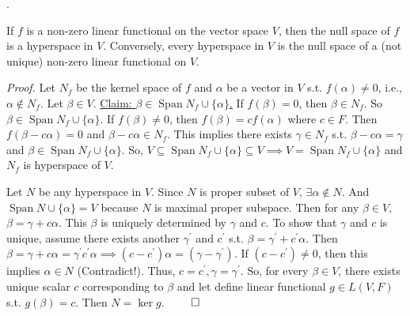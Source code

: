 \documentclass[8pt]{beamer}
\newcommand{\ti}[1]{\textit{#1}}
\newcommand{\Span}{\operatorname{Span}}
\begin{document}
\begin{frame}{.}
\begin{theorem}
        If $f$ is a non-zero linear functional on the vector space $V$, then the null space of $f$ is a hyperspace in $V$.
        Conversely, every hyperspace in $V$ is the null space of a (not unique) non-zero linear functional on $V$.
    \end{theorem}
    \ti{Proof.}
    Let $N_f$ be the kernel space of $f$ and $\alpha$ be a vector in $V$ s.t. $f(\alpha) \neq 0$, i.e., $\alpha \notin N_f$.
    Let $\beta \in V$.
    \underline{Claim: $\beta \in \Span N_f \cup \{\alpha\}$.}
    If $f(\beta) = 0$, then $\beta \in N_f$.
    So $\beta \in \Span N_f \cup \{\alpha\}$.
    If $f(\beta) \neq 0$, then $f(\beta) = cf(\alpha)$ where $c \in F$.
    Then $f(\beta - c \alpha) = 0$ and $\beta - c \alpha \in N_f$.
    This implies there exists $\gamma \in N_f$ s.t. $
    \beta - c \alpha = \gamma$ and $\beta \in \Span N_f \cup \{\alpha\}$.
    So, $V \subseteq \Span N_f \cup \{\alpha\} \subseteq V \implies V = \Span N_f \cup \{\alpha\}$ and $N_f$ is hyperspace of $V$.

    Let $N$ be any hyperspace in $V$.
    Since $N$ is proper subset of $V$, $\exists \alpha \notin N$. And $\Span N \cup \{\alpha\} = V$ because $N$ is maximal proper subspace.
    Then for any $\beta \in V$, $\beta = \gamma + c \alpha$. This $\beta$ is uniquely determined by $\gamma$ and $c$.
    To show that $\gamma$ and $c$ is unique, assume there exists another $\gamma^\prime$ and $c^\prime$ s.t. $\beta = \gamma^\prime + c^\prime \alpha$.
    Then $\beta = \gamma + c \alpha = \gamma^\prime c^\prime \alpha \implies (c - c^\prime) \alpha = (\gamma - \gamma^\prime)$. If $(c-c^\prime) \neq 0$, then this implies $\alpha \in N$ (Contradict!).
    Thus, $c = c^\prime, \gamma = \gamma^\prime$.
    So, for every $\beta \in V$, there exists unique scalar $c$ corresponding to $\beta$ and let define linear functional $g \in L(V, F)$ s.t. $g(\beta) = c$.
    Then $N = \ker g$.
    $\qed$
\end{frame}
\end{document}
